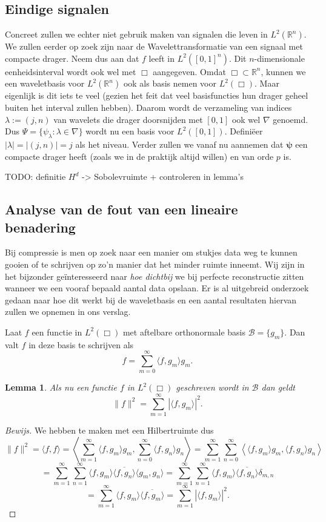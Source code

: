\documentclass[11pt]{report}
\newcommand{\R}{\mathbb{R}}
\theoremstyle{plain}
\newtheorem*{lemm}{Lemma}
\theoremstyle{remark}
\begin{document}
\subsection{Eindige signalen}
Concreet zullen we echter niet gebruik maken van signalen die leven in $L^2(\R^n)$. We zullen eerder op zoek zijn naar de Wavelettransformatie van een signaal met compacte drager. Neem dus aan dat $f$ leeft in $L^2([0,1]^n)$. Dit $n$-dimensionale eenheidsinterval wordt ook wel met $\Box$ aangegeven. Omdat $\Box \subset \R^n$, kunnen we een waveletbasis voor $L^2(\R^n)$ ook als basis nemen voor $L^2(\Box)$. Maar eigenlijk is dit iets te veel (gezien het feit dat veel basisfuncties hun drager geheel buiten het interval zullen hebben). Daarom wordt de verzameling van indices $\lambda := (j,n)$ van wavelets die drager doorsnijden met $[0,1]$ ook wel $\nabla$ genoemd. Dus $\Psi = \{ \psi_\lambda: \lambda \in \nabla \}$ wordt nu een basis voor $L^2([0,1])$. Defini\"eer $|\lambda| = |(j,n)| = j$ als het niveau.
Verder zullen we vanaf nu aannemen dat $\boldsymbol\psi$ een compacte drager heeft (zoals we in de praktijk altijd willen) en van orde $p$ is.

TODO: definitie $H^d$ -> Sobolevruimte + controleren in lemma's

\subsection{Analyse van de fout van een lineaire benadering}
Bij compressie is men op zoek naar een manier om stukjes data weg te kunnen gooien of te schrijven op zo'n manier dat het minder ruimte inneemt. Wij zijn in het bijzonder ge\"interesseerd naar \emph{hoe dichtbij} we bij perfecte reconstructie zitten wanneer we een vooraf bepaald aantal data opslaan. Er is al uitgebreid onderzoek gedaan naar hoe dit werkt bij de waveletbasis en een aantal resultaten hiervan zullen we opnemen in ons verslag.

Laat $f$ een functie in $L^2(\Box)$ met aftelbare orthonormale basis $\mathcal{B} = \{ g_m \}$. Dan valt $f$ in deze basis te schrijven als
\[
	f = \sum_{m = 0}^\infty \langle f, g_m \rangle g_m.
\]

\begin{lemm}
Als nu een functie $f$ in $L^2(\Box)$ geschreven wordt in $\mathcal{B}$ dan geldt
\[
	\|f\|^2 = \sum_{m=1}^\infty | \langle f, g_m \rangle |^2.
\]
\end{lemm}
\begin{proof}[Bewijs]
We hebben te maken met een Hilbertruimte dus
\[
\|f\|^2 = \langle f, f \rangle = \left\langle \sum_{m=1}^\infty \langle f, g_m \rangle g_m, \sum_{n=0}^\infty \langle f, g_n \rangle g_n \right\rangle = \sum_{m=1}^\infty \sum_{n=0}^\infty \left\langle \langle f, g_m \rangle g_m, \langle f, g_n \rangle g_n \right \rangle
\]
\[
 = \sum_{m=1}^\infty \sum_{n=1}^\infty \langle f, g_m \rangle \overline{\langle f, g_n \rangle}\langle g_m, g_n \rangle = \sum_{m=1}^\infty \sum_{n=1}^\infty \langle f, g_m \rangle \overline{\langle f, g_n \rangle} \delta_{m,n} 
\]
\[ = \sum_{m=1}^\infty \langle f, g_m \rangle \overline{\langle f, g_m \rangle} = \sum_{m=1}^\infty |\langle f, g_m \rangle |^2.
\]
\end{proof}
\end{document}
